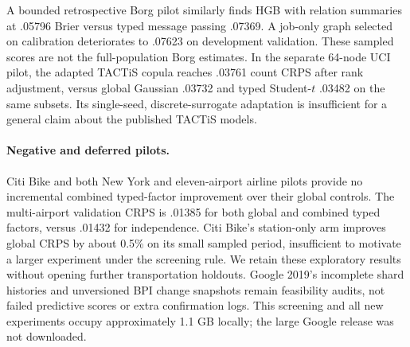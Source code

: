 A bounded retrospective Borg pilot similarly finds HGB with relation summaries
at .05796 Brier versus typed message passing .07369. A job-only graph selected
on calibration deteriorates to .07623 on development validation. These sampled
scores are not the full-population Borg estimates. In the separate 64-node UCI
pilot, the adapted TACTiS copula reaches .03761 count CRPS after rank adjustment,
versus global Gaussian .03732 and typed Student-$t$ .03482 on the same subsets.
Its single-seed, discrete-surrogate adaptation is insufficient for a general
claim about the published TACTiS models.

\paragraph{Negative and deferred pilots.}
Citi Bike and both New York and eleven-airport airline pilots provide no
incremental combined typed-factor improvement over their global controls.
The multi-airport validation CRPS is .01385 for both global and combined
typed factors, versus .01432 for independence. Citi Bike's station-only arm
improves global CRPS by about 0.5\% on its small sampled period, insufficient
to motivate a larger experiment under the screening rule. We retain these exploratory
results without opening further transportation holdouts. Google 2019's
incomplete shard histories and unversioned BPI change snapshots remain
feasibility audits, not failed predictive scores or extra confirmation logs.
This screening and all new experiments occupy approximately 1.1 GB locally;
the large Google release was not downloaded.
